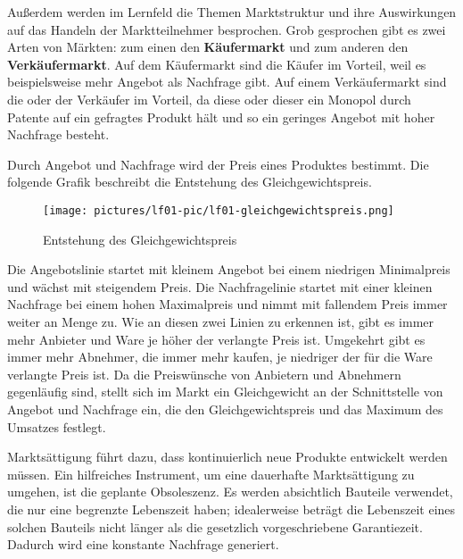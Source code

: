 Außerdem werden im Lernfeld die Themen Marktstruktur und ihre Auswirkungen auf das Handeln der Marktteilnehmer besprochen. Grob gesprochen gibt es zwei Arten von Märkten: zum einen den {\bf Käufermarkt} und zum anderen den {\bf Verkäufermarkt}. Auf dem Käufermarkt sind die Käufer im Vorteil, weil es beispielsweise mehr Angebot als Nachfrage gibt. Auf einem Verkäufermarkt sind die oder der Verkäufer im Vorteil, da diese oder dieser ein Monopol durch Patente auf ein gefragtes Produkt hält und so ein geringes Angebot mit hoher Nachfrage besteht.

Durch Angebot und Nachfrage wird der Preis eines Produktes bestimmt. Die folgende Grafik beschreibt die Entstehung des Gleichgewichtspreis.

\begin{wrapfigure}{l}{0.3\textwidth}
	\begin{center}
		\texttt{[image: pictures/lf01-pic/lf01-gleichgewichtspreis.png]}
	\end{center}
	\caption{Entstehung des Gleichgewichtspreis}
\end{wrapfigure}

Die Angebotslinie startet mit kleinem Angebot bei einem niedrigen Minimalpreis und wächst mit steigendem Preis. Die Nachfragelinie startet mit einer kleinen Nachfrage bei einem hohen Maximalpreis und nimmt mit fallendem Preis immer weiter an Menge zu. Wie an diesen zwei Linien zu erkennen ist, gibt es immer mehr Anbieter und Ware je höher der verlangte Preis ist. Umgekehrt gibt es immer mehr Abnehmer, die immer mehr kaufen, je niedriger der für die Ware verlangte Preis ist. Da die Preiswünsche von Anbietern und Abnehmern gegenläufig sind, stellt sich im Markt ein Gleichgewicht an der Schnittstelle von Angebot und Nachfrage ein, die den Gleichgewichtspreis und das Maximum des Umsatzes festlegt.

Marktsättigung führt dazu, dass kontinuierlich neue Produkte entwickelt werden müssen. Ein hilfreiches Instrument, um eine dauerhafte Marktsättigung zu umgehen, ist die geplante Obsoleszenz. Es werden absichtlich Bauteile verwendet, die nur eine begrenzte Lebenszeit haben; idealerweise beträgt die Lebenszeit eines solchen Bauteils nicht länger als die gesetzlich vorgeschriebene Garantiezeit. Dadurch wird eine konstante Nachfrage generiert.


